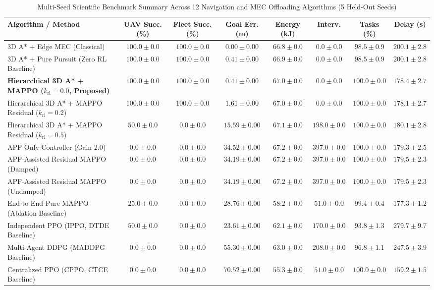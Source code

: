 \documentclass[conference]{IEEEtran}
\begin{document}
\begin{table}[!t]
\caption{Multi-Seed Scientific Benchmark Summary Across 12 Navigation and MEC Offloading Algorithms (5 Held-Out Seeds)}
\label{tab:benchmark_summary}
\centering
\scriptsize
\begin{tabular}{lccccccc}
\toprule
\textbf{Algorithm / Method} & \textbf{UAV Succ. (\%)} & \textbf{Fleet Succ. (\%)} & \textbf{Goal Err. (m)} & \textbf{Energy (kJ)} & \textbf{Interv.} & \textbf{Tasks (\%)} & \textbf{Delay (s)} \\
\midrule
3D A* + Edge MEC (Classical) & $100.0 \pm 0.0$ & $100.0 \pm 0.0$ & $0.00 \pm 0.00$ & $66.8 \pm 0.0$ & $0.0 \pm 0.0$ & $98.5 \pm 0.9$ & $200.1 \pm 2.8$ \\
3D A* + Pure Pursuit (Zero RL Baseline) & $100.0 \pm 0.0$ & $100.0 \pm 0.0$ & $0.41 \pm 0.00$ & $66.9 \pm 0.0$ & $0.0 \pm 0.0$ & $98.5 \pm 0.9$ & $200.1 \pm 2.8$ \\
\textbf{Hierarchical 3D A* + MAPPO ($k_{\text{rl}}=0.0$, Proposed)} & $\mathbf{100.0 \pm 0.0}$ & $\mathbf{100.0 \pm 0.0}$ & $\mathbf{0.41 \pm 0.00}$ & $\mathbf{67.0 \pm 0.0}$ & $\mathbf{0.0 \pm 0.0}$ & $\mathbf{100.0 \pm 0.0}$ & $\mathbf{178.4 \pm 2.7}$ \\
Hierarchical 3D A* + MAPPO Residual ($k_{\text{rl}}=0.2$) & $100.0 \pm 0.0$ & $100.0 \pm 0.0$ & $1.61 \pm 0.00$ & $67.0 \pm 0.0$ & $0.0 \pm 0.0$ & $100.0 \pm 0.0$ & $178.1 \pm 2.7$ \\
Hierarchical 3D A* + MAPPO Residual ($k_{\text{rl}}=0.5$) & $50.0 \pm 0.0$ & $0.0 \pm 0.0$ & $15.59 \pm 0.00$ & $67.1 \pm 0.0$ & $198.0 \pm 0.0$ & $100.0 \pm 0.0$ & $180.1 \pm 2.8$ \\
APF-Only Controller (Gain 2.0) & $0.0 \pm 0.0$ & $0.0 \pm 0.0$ & $34.52 \pm 0.00$ & $67.2 \pm 0.0$ & $397.0 \pm 0.0$ & $100.0 \pm 0.0$ & $179.3 \pm 2.5$ \\
APF-Assisted Residual MAPPO (Damped) & $0.0 \pm 0.0$ & $0.0 \pm 0.0$ & $34.19 \pm 0.00$ & $67.2 \pm 0.0$ & $397.0 \pm 0.0$ & $100.0 \pm 0.0$ & $179.5 \pm 2.3$ \\
APF-Assisted Residual MAPPO (Undamped) & $0.0 \pm 0.0$ & $0.0 \pm 0.0$ & $34.19 \pm 0.00$ & $67.2 \pm 0.0$ & $397.0 \pm 0.0$ & $100.0 \pm 0.0$ & $179.5 \pm 2.3$ \\
End-to-End Pure MAPPO (Ablation Baseline) & $25.0 \pm 0.0$ & $0.0 \pm 0.0$ & $28.76 \pm 0.00$ & $58.2 \pm 0.0$ & $51.0 \pm 0.0$ & $99.4 \pm 0.4$ & $177.3 \pm 1.2$ \\
Independent PPO (IPPO, DTDE Baseline) & $50.0 \pm 0.0$ & $0.0 \pm 0.0$ & $23.61 \pm 0.00$ & $62.1 \pm 0.0$ & $170.0 \pm 0.0$ & $93.8 \pm 1.3$ & $279.7 \pm 9.7$ \\
Multi-Agent DDPG (MADDPG Baseline) & $0.0 \pm 0.0$ & $0.0 \pm 0.0$ & $55.30 \pm 0.00$ & $63.0 \pm 0.0$ & $208.0 \pm 0.0$ & $96.8 \pm 1.1$ & $247.5 \pm 3.9$ \\
Centralized PPO (CPPO, CTCE Baseline) & $0.0 \pm 0.0$ & $0.0 \pm 0.0$ & $70.52 \pm 0.00$ & $55.3 \pm 0.0$ & $51.0 \pm 0.0$ & $100.0 \pm 0.0$ & $159.2 \pm 1.5$ \\
\bottomrule
\end{tabular}
\end{table}
\end{document}
